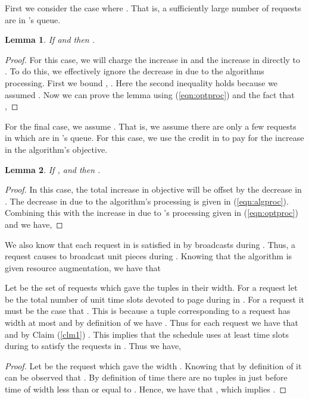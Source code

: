 \documentclass[11pt]{article}
\newtheorem{lemma}{Lemma}[section]
\begin{document}
\iffalse

 First we consider the case where .  That is, a sufficiently large number of requests  are in 's queue.

\begin{lemma}
\label{lem:optflow}
If  and  then .
\end{lemma} 
\begin{proof}
For this case, we will charge the increase in  and the increase in  directly to .  To do this, we effectively ignore the decrease in  due to the algorithms processing.  First we bound , .  Here the second inequality holds because we assumed .  Now we can prove the lemma using (\ref{eqn:optproc}) and the fact that ,



\end{proof}


For the final case, we assume .  That is, we assume there are only a few requests in  which are in 's queue.  For this case, we use the credit in  to pay for the increase in the algorithm's objective.

\begin{lemma}
\label{lem:phi}
If ,  and  then .
\end{lemma}
\begin{proof}
In this case, the total increase in  objective  will be offset by the decrease in .  The decrease in  due to the algorithm's processing is given in (\ref{eqn:algproc}). Combining this with the increase in  due to 's processing given in (\ref{eqn:optproc}) and  we have,


\end{proof} 



We also know that each request in  is satisfied in  by broadcasts during .   Thus, a request  causes  to broadcast   unit pieces during .  Knowing that the algorithm is given  resource augmentation, we have that 

 Let  be the set of requests which gave the tuples in  their width.  For a request  let  be the total number of unit time slots devoted to page  during  in .    For a request  it must be the case that .  This is because a tuple corresponding to a request  has width at most  and by definition of  we have .  Thus for each request  we have that  and by Claim (\ref{clm1}) .  This implies that the schedule  uses at least  time slots during  to satisfy the requests in . Thus we have,  


\begin{proof}
Let  be the request which gave  the width . Knowing that  by definition of  it can be observed that .  By definition of time  there are no tuples in  just before time  of width less than or equal to .  Hence, we have that , which implies .
\end{proof}
\end{document}
